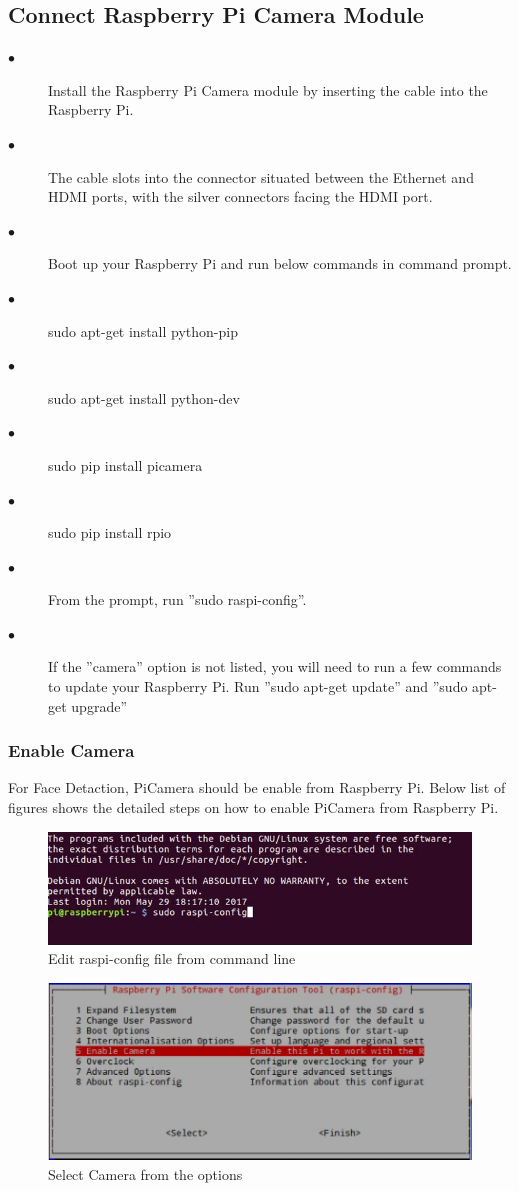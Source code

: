\documentclass[sigconf]{acmart}
\begin{document}
\subsection{Connect Raspberry Pi Camera Module}
\begin{description}
    \item[$\bullet$] Install the Raspberry Pi Camera module by inserting the cable into the Raspberry Pi.
    \item[$\bullet$] The cable slots into the connector situated between the Ethernet and HDMI ports, with the silver connectors facing the HDMI port.
    \item[$\bullet$] Boot up your Raspberry Pi and run below commands in command prompt.
    \item[$\bullet$] sudo apt-get install python-pip
    \item[$\bullet$] sudo apt-get install python-dev
    \item[$\bullet$] sudo pip install picamera
    \item[$\bullet$] sudo pip install rpio
    \item[$\bullet$] From the prompt, run ''sudo raspi-config''. 
    \item[$\bullet$] If the ''camera'' option is not listed, you will need to run a few commands to update your Raspberry Pi. Run ''sudo apt-get update'' and ''sudo apt-get upgrade''
\end{description}
\subsubsection{Enable Camera}
For Face Detaction, PiCamera should be enable from Raspberry Pi. Below list of figures shows the detailed steps on how to enable PiCamera from Raspberry Pi.

\begin{figure}[ht!]
  \includegraphics[width=\columnwidth]{images/enablecamera1.jpg}
  \caption{Edit raspi-config file from command line}
\end{figure}

\begin{figure}[ht!]
  \includegraphics[width=\columnwidth]{images/enablecamera2.jpg}
  \caption{Select Camera from the options}
\end{figure}
\end{document}
